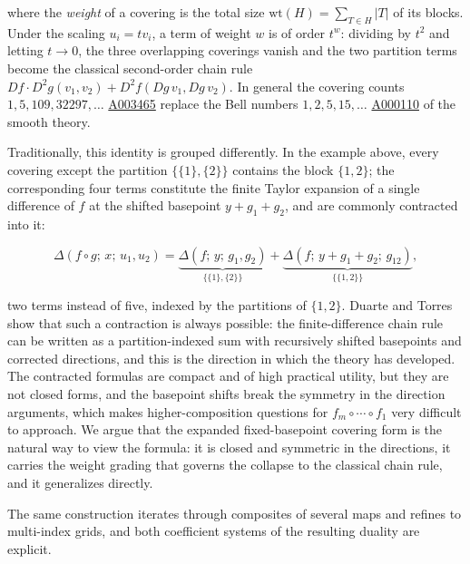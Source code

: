 \documentclass[10pt,a4paper]{article}
\theoremstyle{plain}
\theoremstyle{definition}
\newcommand{\1}{\mathbb{1}} %
\newcommand{\set}[1]{\{#1\}} %
\begin{document}
where the \emph{weight} of a covering is the total size
\(\mathrm{wt}(H) = \sum_{T \in H} |T|\) of its blocks. Under the scaling
\(u_i = t v_i\), a term of weight \(w\) is of order \(t^w\): dividing by
\(t^2\) and letting \(t \to 0\), the three overlapping coverings vanish
and the two partition terms become the classical second-order chain rule
\(Df \cdot D^2g(v_1, v_2) + D^2f(Dg\, v_1, Dg\, v_2)\). In general the
covering counts \(1, 5, 109, 32297, \dots\)
\href{https://oeis.org/A003465}{A003465} replace the Bell numbers
\(1, 2, 5, 15, \dots\) \href{https://oeis.org/A000110}{A000110} of the
smooth theory.

Traditionally, this identity is grouped differently. In the example
above, every covering except the partition \(\set{\set{1},\set{2}}\)
contains the block \(\set{1,2}\); the corresponding four terms
constitute the finite Taylor expansion of a single difference of \(f\)
at the shifted basepoint \(y + g_1 + g_2\), and are commonly contracted
into it:

\[
  \Delta(f \circ g;\, x;\, u_1, u_2)
  = \underbrace{\Delta(f;\, y;\, g_1, g_2)}_{\set{\set{1},\set{2}}}
  + \underbrace{\Delta(f;\, y + g_1 + g_2;\, g_{12})}_{\set{\set{1,2}}},
\]

two terms instead of five, indexed by the partitions of \(\set{1,2}\).
Duarte and Torres \citep{DT2008} show that such a contraction is always
possible: the finite-difference chain rule can be written as a
partition-indexed sum with recursively shifted basepoints and corrected
directions, and this is the direction in which the theory has developed.
The contracted formulas are compact and of high practical utility, but
they are not closed forms, and the basepoint shifts break the symmetry
in the direction arguments, which makes higher-composition questions for
\(f_m \circ \cdots \circ f_1\) very difficult to approach. We argue that
the expanded fixed-basepoint covering form is the natural way to view
the formula: it is closed and symmetric in the directions, it carries
the weight grading that governs the collapse to the classical chain
rule, and it generalizes directly.

The same construction iterates through composites of several maps and
refines to multi-index grids, and both coefficient systems of the
resulting duality are explicit.
\end{document}
